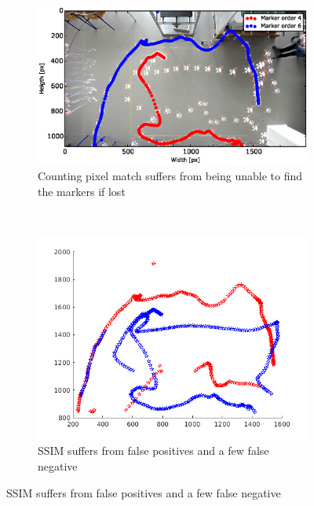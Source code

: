 \begin{figure}[H]
    \centering
    \begin{subfigure}[b]{0.3\textwidth}
        \includegraphics[width=\textwidth]{graphics/markerlocator_compare_raw.eps}
        \caption{Counting pixel match suffers from being unable to find the markers if lost}
        \label{fig:markerlocator_algorihm_native}
    \end{subfigure}
    ~ %
    \begin{subfigure}[b]{0.3\textwidth}
        \includegraphics[width=\textwidth]{graphics/markerlocator_ssim.png}
        \caption{SSIM suffers from false positives and a few false negative}
        \label{fig:markerlocator_algorithm_ssim}
    \end{subfigure}

\end{figure}
